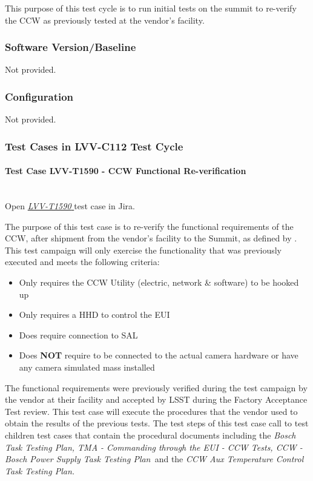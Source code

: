 \documentclass[SE,lsstdraft,STR,toc]{lsstdoc}
\providecommand{\tightlist}{
  \setlength{\itemsep}{0pt}\setlength{\parskip}{0pt}}
\begin{document}
This purpose of this test cycle is to run initial tests on the summit to
re-verify the CCW as previously tested at the vendor's facility.


\subsubsection{Software Version/Baseline}
Not provided.

\subsubsection{Configuration}
Not provided.

\subsubsection{Test Cases in LVV-C112 Test Cycle}

\paragraph{Test Case LVV-T1590 - CCW Functional Re-verification
 }\mbox{}\\

Open  \href{https://jira.lsstcorp.org/secure/Tests.jspa#/testCase/LVV-T1590}{\textit{ LVV-T1590 } }
test case in Jira.

The purpose of this test case is to re-verify the functional
requirements of the CCW, after shipment from the vendor's facility to
the Summit, as defined by . This test campaign will only exercise
the functionality that was previously executed and meets the following
criteria:

\begin{itemize}
\tightlist
\item
  Only requires the CCW Utility (electric, network \& software) to be
  hooked up
\item
  Only requires a HHD to control the EUI
\item
  Does require connection to SAL
\item
  Does \textbf{NOT} require to be connected to the actual camera
  hardware or have any camera simulated mass installed
\end{itemize}

The functional requirements were previously verified during the test
campaign by the vendor at their facility and accepted by LSST during the
Factory Acceptance Test review. This test case will execute the
procedures that the vendor used to obtain the results of the previous
tests. The test steps of this test case call to test children test cases
that contain the procedural documents including the \emph{Bosch Task
Testing Plan, TMA - Commanding through the EUI - CCW Tests, CCW - Bosch
Power Supply Task Testing Plan~}and the \emph{CCW Aux Temperature
Control Task Testing Plan.}\\[2\baselineskip]
\end{document}
